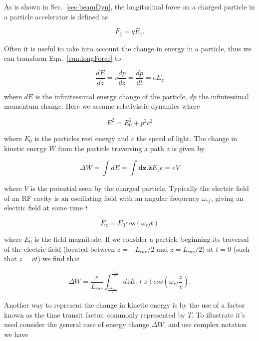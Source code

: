 \label{app:long_motion}

As is shown in Sec.~\ref{sec:beamDyn}, the longitudinal force on a charged particle in a particle accelerator is defined as 

\begin{equation}
F_{\parallel} = qE_{z}.
\label{eqn:longForce}
\end{equation}

Often it is useful to take into account the change in energy in a particle, thus we can transform Eqn.~\ref{eqn:longForce} to

\begin{equation}
\frac{dE}{dz} = v\frac{dp}{dz} = \frac{dp}{dt} = eE_{z}
\end{equation}

where $dE$ is the infinitessimal energy change of the particle, $dp$ the infintessimal momentum change. Here we assume relativistic dynamics where 

\begin{equation}
E^{2} = E_{0}^{2} + p^{2}c^{2}
\end{equation}

where $E_{0}$ is the particles rest energy and $c$ the speed of light. The change in kinetic energy $W$ from the particle traversing a path $z$ is given by

\begin{equation}
\Delta W = \int dE = \int \mathbf{dz}.\mathbf{\hat{z}} E_{z} e = eV
\end{equation}

where $V$ is the potential seen by the charged particle. Typically the electric field of an RF cavity is an oscillating field with an angular frequency $\omega_{rf}$, giving an electric field at some time $t$

\begin{equation}
E_{z} = E_{0} cos \left( \omega_{rf} t \right)
\end{equation}

where $E_{0}$ is the field magnitude. If we consider a particle beginning its traversal of the electric field (located between $z=-L_{cav}/2$ and $z=L_{cav}/2$) at $t=0$ (such that $z=vt$) we find that

\begin{equation}
\Delta W = \frac{e}{L_{cav}} \int^{\frac{L_{cav}}{2}}_{\frac{-L_{cav}}{2}} dz E_{z}\left( z \right) cos \left( \omega_{rf} \frac{z}{v} \right).
\end{equation}

Another way to represent the change in kinetic energy is by the use of a factor known as the time transit factor, commonly represented by $T$. To illustrate it's used consider the general case of energy change $\Delta W$, and use complex notation we have

